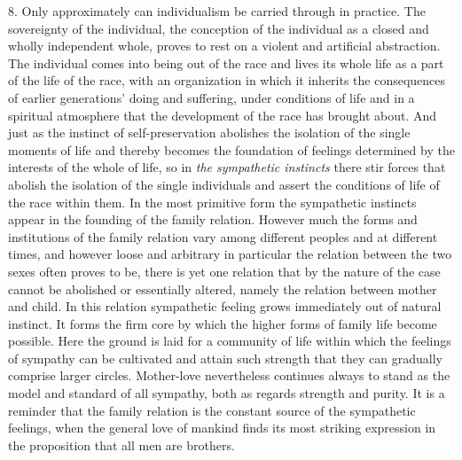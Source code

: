 \documentclass[12pt,a4paper,openany]{book}
\newcommand{\opage}[1]{\marginnote{\footnotesize\textit{[#1]}}}
\begin{document}
8. Only approximately can individualism be carried through in practice. The sovereignty of the
individual, the conception of the individual as a closed and wholly independent whole, proves to rest
on a violent and artificial abstraction. The individual comes into being out of the race and lives
its whole life as a part of the life of the race, with an organization in which it inherits the
consequences of earlier generations' doing and suffering, under conditions of life and in a spiritual
atmosphere that the development of the race has brought about. And just as the instinct of
self-preservation abolishes the isolation of the single moments of life and thereby becomes the
foundation of feelings determined by the interests of the whole of life, so in \textit{the
sympathetic instincts} there stir forces that abolish the isolation of the single individuals and
assert the conditions of life of the race within them. In the most primitive form the sympathetic
instincts appear in the founding of the family relation. However much the forms and institutions of
the family relation vary among different peoples and at different times, and however loose and
\opage{37}arbitrary in particular the relation between the two sexes often proves to be, there is yet one
relation that by the nature of the case cannot be abolished or essentially altered, namely the
relation between mother and child. In this relation sympathetic feeling grows immediately out of
natural instinct. It forms the firm core by which the higher forms of family life become possible.
Here the ground is laid for a community of life within which the feelings of sympathy can be
cultivated and attain such strength that they can gradually comprise larger circles. Mother-love
nevertheless continues always to stand as the model and standard of all sympathy, both as regards
strength and purity. It is a reminder that the family relation is the constant source of the
sympathetic feelings, when the general love of mankind finds its most striking expression in the
proposition that all men are brothers.
\end{document}
